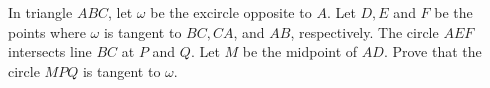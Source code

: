 In triangle 
$ABC$,
 let 
$\omega$
 be the excircle opposite to 
$A$.
 Let 
$D, E$
 and 
$F$
 be the points where 
$\omega$
 is tangent to 
$BC, CA$,
 and 
$AB$,
 respectively. The circle 
$AEF$
 intersects line 
$BC$
 at 
$P$
 and 
$Q$.
 Let 
$M$
 be the midpoint of 
$AD$.
 Prove that the circle 
$MPQ$
 is tangent to 
$\omega$.

